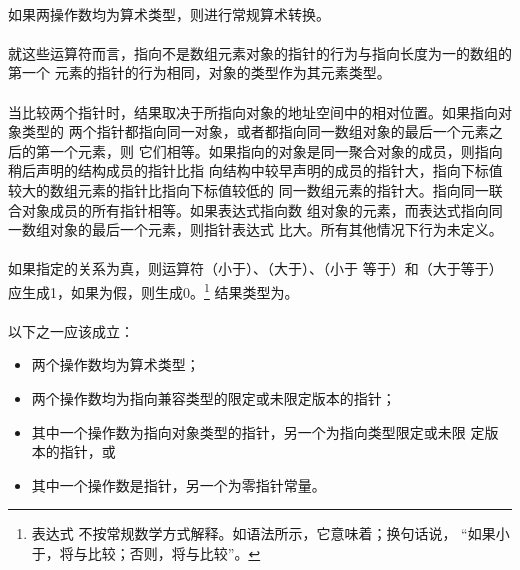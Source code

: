 {\semantic
\paragraph{}
如果两操作数均为算术类型，则进行常规算术转换。

\paragraph{}
就这些运算符而言，指向不是数组元素对象的指针的行为与指向长度为一的数组的第一个
元素的指针的行为相同，对象的类型作为其元素类型。

\paragraph{}
当比较两个指针时，结果取决于所指向对象的地址空间中的相对位置。如果指向对象类型的
两个指针都指向同一对象，或者都指向同一数组对象的最后一个元素之后的第一个元素，则
它们相等。如果指向的对象是同一聚合对象的成员，则指向稍后声明的结构成员的指针比指
向结构中较早声明的成员的指针大，指向下标值较大的数组元素的指针比指向下标值较低的
同一数组元素的指针大。指向同一联合对象成员的所有指针相等。如果表达式指向数
组对象的元素，而表达式指向同一数组对象的最后一个元素，则指针表达式
比大。所有其他情况下行为未定义。

\paragraph{}
如果指定的关系为真，则运算符\tm{\tl}（小于）、\tm{\tg}（大于）、\tm{\tl=}（小于
等于）和\tm{\tg=}（大于等于）应生成1，如果为假，则生成0。\footnote{表达式
不按常规数学方式解释。如语法所示，它意味着；换句话说，
``如果小于，将与比较；否则，将与比较''。}
结果类型为。

\syntax
\paragraph{}

\constraint
\paragraph{}
以下之一应该成立：
\begin{itemize}
  \item{两个操作数均为算术类型；}
  \item{两个操作数均为指向兼容类型的限定或未限定版本的指针；}
  \item{其中一个操作数为指向对象类型的指针，另一个为指向类型限定或未限
    定版本的指针，或}
  \item{其中一个操作数是指针，另一个为零指针常量。}
\end{itemize}

}
